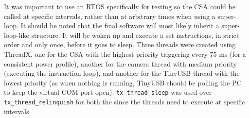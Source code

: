 It was important to use an RTOS specifically for testing so the CSA could be called at specific intervals, rather than at arbitrary times when using a super-loop. It should be noted that the final software will most likely inherit a super-loop-like structure. It will be woken up and execute a set instructions, in strict order and only once, before it goes to sleep.
\nl
Three threads were created using ThreadX, one for the CSA with the highest priority triggering every 75 ms (for a consistent power profile), another for the camera thread with medium priority (executing the instruction loop), and another for the TinyUSB thread with the lowest priority (as when nothing is running, TinyUSB should be polling the PC to keep the virtual COM port open).
\nl
\verb|tx_thread_sleep| was used over \verb|tx_thread_relinquish| for both the since the threads need to execute at specific intervals.
